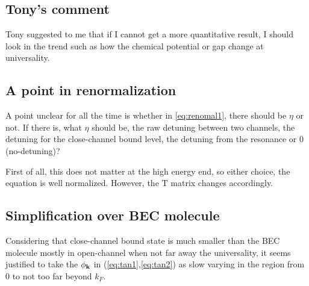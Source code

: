 \subsection{Tony's comment}
Tony suggested to me that if I cannot get a more quantitative result, I should look in the trend such as how the chemical potential or gap change at universality.  

\subsection{A point in renormalization}
A point unclear for all the time is whether  in \eqref{eq:renomal1}, there should be $\eta$ or not.  If there is, what $\eta$ should be, the raw detuning between two channels, the detuning for the close-channel bound level, the detuning from the resonance or 0 (no-detuning)?  

First of all, this does not matter at the high energy end, so either choice, the equation is well normalized.  However, the T matrix changes accordingly.  

\subsection{Simplification over BEC molecule}
Considering that close-channel bound state is much smaller than the  BEC molecule mostly in open-channel when not far away the universality, it seems justified to take the $\phi_{\mathbf{k}}$ in (\ref{eq:tan1},\ref{eq:tan2}) as slow varying in the region from 0 to not too far beyond $k_F$.    
